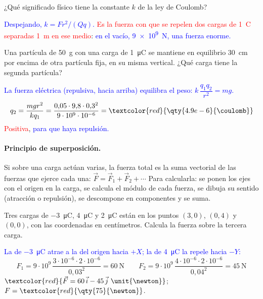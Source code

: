 \begin{exercise}
    ¿Qué significado físico tiene la constante \(k\) de la ley de Coulomb?
    \begin{solu}
        \textcolor{blue}{Despejando, \(k = F r^2/(Qq)\).} \textcolor{red}{Es la fuerza con que se repelen dos cargas de
        \qty{1}{\coulomb} separadas \qty{1}{\m} en ese medio}: \textcolor{blue}{en el vacío, \qty{9e9}{\newton}, una fuerza enorme.}
    \end{solu}
\end{exercise}

\begin{exercise}
    Una partícula de \qty{50}{\g} con una carga de \qty{1}{\micro\coulomb} se mantiene en equilibrio \qty{30}{\cm} por encima
    de otra partícula fija, en su misma vertical. ¿Qué carga tiene la segunda partícula?
    \begin{solu}
        \textcolor{blue}{La fuerza eléctrica (repulsiva, hacia arriba) equilibra el peso: \(k\,\dfrac{q_1 q_2}{r^2} = mg\).}
        \[ q_2 = \dfrac{m g r^2}{k q_1} = \dfrac{0{,}05\cdot 9{,}8\cdot 0{,}3^2}{9\cdot 10^9\cdot 10^{-6}} = \textcolor{red}{\qty{4.9e-6}{\coulomb}} \]
        \textcolor{red}{Positiva}, \textcolor{blue}{para que haya repulsión.}
    \end{solu}
\end{exercise}

\paragraph{Principio de superposición.} Si sobre una carga actúan varias, la fuerza total es la suma vectorial de las fuerzas
que ejerce cada una: \(\vec F = \vec F_1 + \vec F_2 + \cdots\) Para calcularla: se ponen los ejes con el origen en la carga, se
calcula el módulo de cada fuerza, se dibuja su sentido (atracción o repulsión), se descompone en componentes y se suma.

\begin{exercise}
    Tres cargas de \qty{-3}{\micro\coulomb}, \qty{4}{\micro\coulomb} y \qty{2}{\micro\coulomb} están en los puntos \((3, 0)\),
    \((0, 4)\) y \((0, 0)\), con las coordenadas en centímetros. Calcula la fuerza sobre la tercera carga.
    \begin{solu}
        \textcolor{blue}{La de \qty{-3}{\micro\coulomb} atrae a la del origen hacia \(+X\); la de \qty{4}{\micro\coulomb} la repele hacia \(-Y\):}
        \[ F_1 = 9\cdot 10^9\,\dfrac{3\cdot 10^{-6}\cdot 2\cdot 10^{-6}}{0{,}03^2} = \qty{60}{\newton} \qquad F_2 = 9\cdot 10^9\,\dfrac{4\cdot 10^{-6}\cdot 2\cdot 10^{-6}}{0{,}04^2} = \qty{45}{\newton} \]
        \(\textcolor{red}{\vec F = 60\,\vec{i} - 45\,\vec{j}\ \unit{\newton}}\); \(F = \textcolor{red}{\qty{75}{\newton}}\).
    \end{solu}
\end{exercise}

